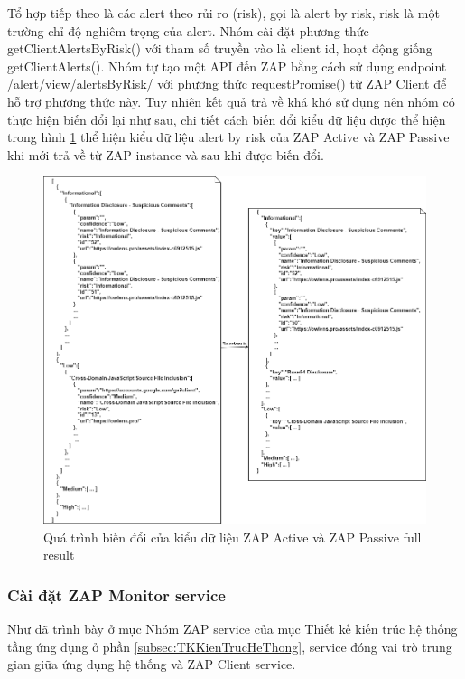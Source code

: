 \begin{itemize}
  Tổ hợp tiếp theo là các alert theo rủi ro (risk), gọi là alert by risk, risk là một trường chỉ độ nghiêm trọng của alert.
  Nhóm cài đặt phương thức getClientAlertsByRisk() với tham số truyền vào là client id, hoạt động giống getClientAlerts().
  Nhóm tự tạo một API đến ZAP bằng cách sử dụng endpoint /alert/view/alertsByRisk/ với phương thức requestPromise() từ ZAP Client để hỗ trợ phương thức này.
  Tuy nhiên kết quả trả về khá khó sử dụng nên nhóm có thực hiện biến đổi lại như sau, chi tiết cách biến đổi kiểu dữ liệu được thể hiện trong hình \ref{fig:ActiveTransformData} thể hiện kiểu dữ liệu alert by risk của ZAP Active và ZAP Passive khi mới trả về từ ZAP instance và sau khi được biến đổi.
  \begin{figure}[H]
    \centering
    \includegraphics[width=\textwidth]{applied-thesis-chapters/chapter-4/Quá trình biến đổi của kiểu dữ liệu ZAP Active và ZAP Passive full result.png}
    \caption{Quá trình biến đổi của kiểu dữ liệu ZAP Active và ZAP Passive full result}
    \label{fig:ActiveTransformData}
\end{figure}
\end{itemize}

\subsubsection{Cài đặt ZAP Monitor service}

\tab Như đã trình bày ở mục Nhóm ZAP service của mục Thiết kế kiến trúc hệ thống tầng ứng dụng ở phần \ref{subsec:TKKienTrucHeThong}, service đóng vai trò trung gian giữa ứng dụng hệ thống và ZAP Client service.

